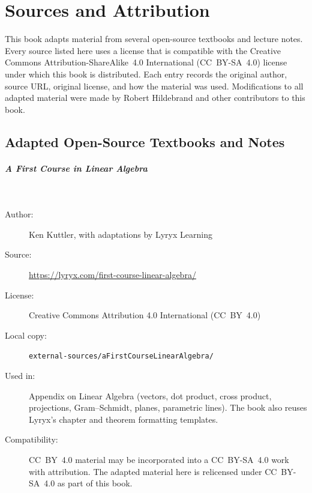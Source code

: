 \chapter*{Sources and Attribution}

This book adapts material from several open-source textbooks and lecture
notes. Every source listed here uses a license that is compatible with
the Creative Commons Attribution-ShareAlike~4.0 International
(CC~BY-SA~4.0) license under which this book is distributed. Each entry
records the original author, source URL, original license, and how the
material was used. Modifications to all adapted material were made by
Robert Hildebrand and other contributors to this book.

\section*{Adapted Open-Source Textbooks and Notes}

\paragraph{A First Course in Linear Algebra}\hspace{0pt}\\[-0.6em]
\begin{description}
  \item[Author:] Ken Kuttler, with adaptations by Lyryx Learning
  \item[Source:] \url{https://lyryx.com/first-course-linear-algebra/}
  \item[License:] Creative Commons Attribution 4.0 International (CC~BY~4.0)
  \item[Local copy:] \texttt{external-sources/aFirstCourseLinearAlgebra/}
  \item[Used in:] Appendix on Linear Algebra (vectors, dot product,
    cross product, projections, Gram--Schmidt, planes, parametric
    lines). The book also reuses Lyryx's chapter and theorem
    formatting templates.
  \item[Compatibility:] CC~BY~4.0 material may be incorporated into a
    CC~BY-SA~4.0 work with attribution. The adapted material here is
    relicensed under CC~BY-SA~4.0 as part of this book.
\end{description}

